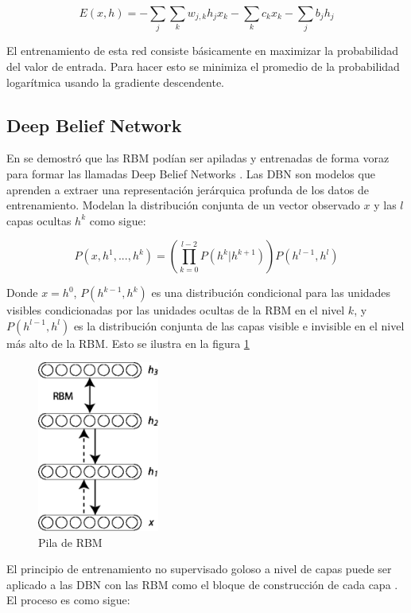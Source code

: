 \begin{equation}
E(x, h) = -\sum_j \sum_k w_{j,k} h_j x_k - \sum_k c_k x_k - \sum_j b_j h_j
\end{equation}

El entrenamiento de esta red consiste básicamente en maximizar la probabilidad del valor de entrada. Para hacer esto se minimiza el promedio de la probabilidad logarítmica usando la gradiente descendente.


\subsection{Deep Belief Network}

En \cite{hinton2006reducing} se demostró que las \ac{RBM} podían ser apiladas y entrenadas de forma voraz para formar las llamadas Deep Belief Networks \cite{erhan2010does}. Las \ac{DBN} son modelos que aprenden a extraer una representación jerárquica profunda de los datos de entrenamiento. Modelan la distribución conjunta de un vector observado $x$ y las $l$ capas ocultas $h^k$ como sigue:

\begin{equation}
P(x, h^1, ..., h^k) = \left(\prod_{k=0}^{l-2} P(h^k|h^{k+1})\right) P(h^{l-1}, h^l)
\end{equation}

Donde $x = h^0$, $P(h^{k-1},h^k)$ es una distribución condicional para las unidades visibles condicionadas por las unidades ocultas de la \ac{RBM} en el nivel $k$, y $P(h^{l-1},h^l)$ es la distribución conjunta de las capas visible e invisible en el nivel más alto de la \ac{RBM}. Esto se ilustra en la figura \ref{fig:rbm_stack}

\begin{figure}[htb]
\centering
\includegraphics[width=40mm]{./graficos/rbm_stack.png}
\caption{Pila de RBM} \label{fig:rbm_stack}
\end{figure}

El principio de entrenamiento no supervisado goloso a nivel de capas puede ser aplicado a las \ac{DBN} con las \ac{RBM} como el bloque de construcción de cada capa \cite{hinton2006reducing, bengio2007greedy}. El proceso es como sigue:


